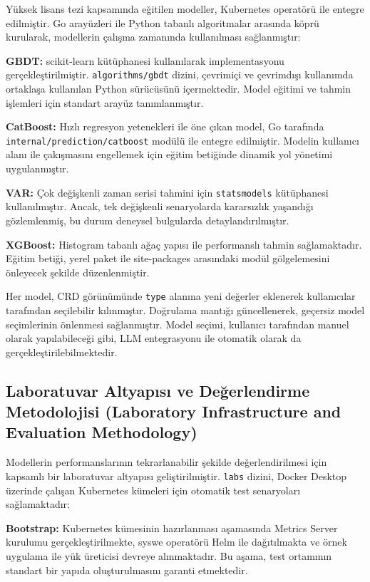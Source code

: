 \documentclass[12pt,a4paper]{article}
\begin{document}
Yüksek lisans tezi kapsamında eğitilen modeller, Kubernetes operatörü ile entegre edilmiştir. Go arayüzleri ile Python tabanlı algoritmalar arasında köprü kurularak, modellerin çalışma zamanında kullanılması sağlanmıştır:

\textbf{GBDT:} scikit-learn kütüphanesi kullanılarak implementasyonu gerçekleştirilmiştir. \texttt{algorithms/gbdt} dizini, çevrimiçi ve çevrimdışı kullanımda ortaklaşa kullanılan Python sürücüsünü içermektedir. Model eğitimi ve tahmin işlemleri için standart arayüz tanımlanmıştır.

\textbf{CatBoost:} Hızlı regresyon yetenekleri ile öne çıkan model, Go tarafında \texttt{internal/prediction/catboost} modülü ile entegre edilmiştir. Modelin kullanıcı alanı ile çakışmasını engellemek için eğitim betiğinde dinamik yol yönetimi uygulanmıştır.

\textbf{VAR:} Çok değişkenli zaman serisi tahmini için \texttt{statsmodels} kütüphanesi kullanılmıştır. Ancak, tek değişkenli senaryolarda kararsızlık yaşandığı gözlemlenmiş, bu durum deneysel bulgularda detaylandırılmıştır.

\textbf{XGBoost:} Histogram tabanlı ağaç yapısı ile performanslı tahmin sağlamaktadır. Eğitim betiği, yerel paket ile site-packages arasındaki modül gölgelemesini önleyecek şekilde düzenlenmiştir.

Her model, CRD görünümünde \texttt{type} alanına yeni değerler eklenerek kullanıcılar tarafından seçilebilir kılınmıştır. Doğrulama mantığı güncellenerek, geçersiz model seçimlerinin önlenmesi sağlanmıştır. Model seçimi, kullanıcı tarafından manuel olarak yapılabileceği gibi, LLM entegrasyonu ile otomatik olarak da gerçekleştirilebilmektedir.

\subsection{Laboratuvar Altyapısı ve Değerlendirme Metodolojisi (Laboratory Infrastructure and Evaluation Methodology)}

Modellerin performanslarının tekrarlanabilir şekilde değerlendirilmesi için kapsamlı bir laboratuvar altyapısı geliştirilmiştir. \texttt{labs} dizini, Docker Desktop üzerinde çalışan Kubernetes kümeleri için otomatik test senaryoları sağlamaktadır:

\textbf{Bootstrap:} Kubernetes kümesinin hazırlanması aşamasında Metrics Server kurulumu gerçekleştirilmekte, syswe operatörü Helm ile dağıtılmakta ve örnek uygulama ile yük üreticisi devreye alınmaktadır. Bu aşama, test ortamının standart bir yapıda oluşturulmasını garanti etmektedir.
\end{document}
